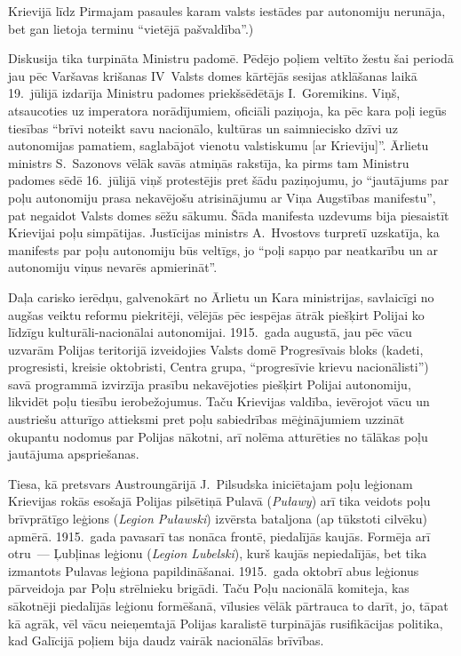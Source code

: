 \documentclass[twoside,a5paper,12pt,fleqn,openany]{extbook}
\newcommand{\pltxti}[1]{\textit{\textpolish{#1}}}
\begin{document}
Krievijā līdz Pirmajam pasaules karam valsts iestādes par autonomiju nerunāja, bet gan lietoja terminu ``vietējā pašvaldība''.)

Diskusija tika turpināta Ministru padomē. Pēdējo poļiem veltīto žestu šai periodā jau pēc Varšavas krišanas IV~Valsts domes kārtējās sesijas atklāšanas laikā 19.~jūlijā izdarīja Ministru padomes priekšsēdētājs I.~Goremikins. Viņš, atsaucoties uz imperatora norādījumiem, oficiāli paziņoja, ka pēc kara poļi iegūs tiesības ``brīvi noteikt savu nacionālo, kultūras un saimniecisko dzīvi uz autonomijas pamatiem, saglabājot vienotu valstiskumu [ar Krieviju]''. Ārlietu ministrs S.~Sazonovs vēlāk savās atmiņās rakstīja, ka pirms tam Ministru padomes sēdē 16.~jūlijā viņš protestējis pret šādu paziņojumu, jo ``jautājums par poļu autonomiju prasa nekavējošu atrisinājumu ar Viņa Augstības manifestu'', pat negaidot Valsts domes sēžu sākumu. Šāda manifesta uzdevums bija piesaistīt Krievijai poļu simpātijas. Justīcijas ministrs A.~Hvostovs turpretī uzskatīja, ka manifests par poļu autonomiju būs veltīgs, jo ``poļi sapņo par neatkarību un ar autonomiju viņus nevarēs apmierināt''.

Daļa carisko ierēdņu, galvenokārt no Ārlietu un Kara ministrijas, savlaicīgi no augšas veiktu reformu piekritēji, vēlējās pēc iespējas ātrāk piešķirt Polijai ko līdzīgu kulturāli-nacionālai autonomijai. 1915.~gada augustā, jau pēc vācu uzvarām Polijas teritorijā izveidojies Valsts domē Progresīvais bloks (kadeti, progresisti, kreisie oktobristi, Centra grupa, ``progresīvie krievu nacionālisti'') savā programmā izvirzīja prasību nekavējoties piešķirt Polijai autonomiju, likvidēt poļu tiesību ierobežojumus. Taču Krievijas valdība, ievērojot vācu un austriešu atturīgo attieksmi pret poļu sabiedrības mēģinājumiem uzzināt okupantu nodomus par Polijas nākotni, arī nolēma atturēties no tālākas poļu jautājuma apspriešanas.

Tiesa, kā pretsvars Austroungārijā J.~Pilsudska iniciētajam poļu leģionam Krievijas rokās esošajā Polijas pilsētiņā Pulavā (\pltxti{Puławy}) arī tika veidots poļu brīvprātīgo leģions (\pltxti{Legion Puławski}) izvērsta bataljona (ap tūkstoti cilvēku) apmērā. 1915.~gada pavasarī tas nonāca frontē, piedalījās kaujās. Formēja arī otru~--- Ļubļinas leģionu (\pltxti{Legion Lubelski}), kurš kaujās nepiedalījās, bet tika izmantots Pulavas leģiona papildināšanai. 1915.~gada oktobrī abus leģionus pārveidoja par Poļu strēlnieku brigādi. Taču Poļu nacionālā komiteja, kas sākotnēji piedalījās leģionu formēšanā, vīlusies vēlāk pārtrauca to darīt, jo, tāpat kā agrāk, vēl vācu neieņemtajā Polijas karalistē turpinājās rusifikācijas politika, kad Galīcijā poļiem bija daudz vairāk nacionālās brīvības.
\end{document}
